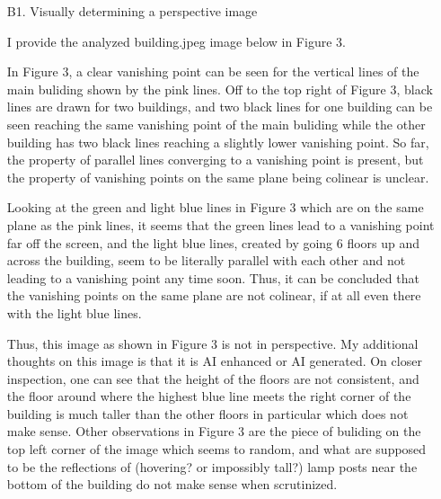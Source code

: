 \documentclass[12pt]{report}
\begin{document}
\begin{enumerate}
\item[B1.] Visually determining a perspective image
  
  I provide the analyzed building.jpeg image below in Figure 3.
  \begin{figure}[h!]
    \centering
  \end{figure}
  
  In Figure 3, a clear vanishing point can be seen for the vertical lines of the
  main buliding shown by the pink lines. Off to the top right of Figure 3, black
  lines are drawn for two buildings, and two black lines for one building can be
  seen reaching the same vanishing point of the main buliding while the other
  building has two black lines reaching a slightly lower vanishing point. So
  far, the property of parallel lines converging to a vanishing point is
  present, but the property of vanishing points on the same plane being colinear
  is unclear.
  
  Looking at the green and light blue lines in Figure 3 which are on the same
  plane as the pink lines, it seems that the green lines lead to a vanishing
  point far off the screen, and the light blue lines, created by going 6 floors
  up and across the building, seem to be literally parallel with each other and
  not leading to a vanishing point any time soon. Thus, it can be concluded that
  the vanishing points on the same plane are not colinear, if at all even there
  with the light blue lines.
  
  Thus, this image as shown in Figure 3 is not in perspective. My additional
  thoughts on this image is that it is AI enhanced or AI generated. On closer
  inspection, one can see that the height of the floors are not consistent, and
  the floor around where the highest blue line meets the right corner of the
  building is much taller than the other floors in particular which does not
  make sense. Other observations in Figure 3 are the piece of buliding on the
  top left corner of the image which seems to random, and what are supposed to
  be the reflections of (hovering? or impossibly tall?) lamp posts near the
  bottom of the building do not make sense when scrutinized.
  

\end{enumerate}
\end{document}
